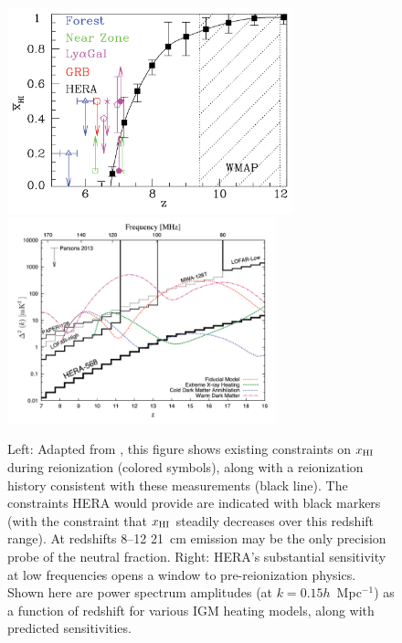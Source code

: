 \documentclass[preprint]{aastex}
\def\HI{{H{\small I }}}
\def\xHI{{x_{\rm\HI}}}
\begin{document}
\begin{figure}[t]\centering
\includegraphics[height=2.35in]{plots/constraints_crop.pdf}  %
\includegraphics[height=2.35in]{plots/Xray.pdf} 
\caption{\small 
Left: Adapted from \citet{robertson_2013}, this figure shows existing
constraints on $\xHI$ during reionization (colored symbols), along with a
reionization history consistent with these measurements (black line). The
constraints HERA would provide are indicated with black markers (with the constraint
that $\xHI$ steadily decreases over this redshift range). At redshifts 8--12
21~cm emission may be the only precision probe of the neutral fraction.  
Right: HERA’s substantial sensitivity at low frequencies opens a window to
pre-reionization physics. Shown here are power spectrum amplitudes (at $k =
0.15h$~Mpc$^{-1}$) as a function of redshift for various IGM heating models,
along with predicted sensitivities.
}\label{fig:x_i_Xray} \end{figure}
\end{document}
